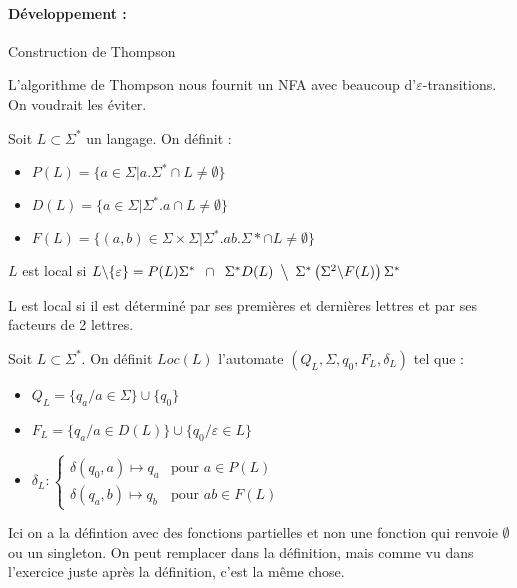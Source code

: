 \paragraph{Développement :} Construction de Thompson

\begin{rem}
	L'algorithme de Thompson nous fournit un NFA avec beaucoup d'$\varepsilon$-transitions. On voudrait les éviter.
\end{rem}

\begin{definition}
	Soit $L \subset \Sigma^*$ un langage. On définit : \begin{itemize}
		\item $P(L) = \{a \in \Sigma | a.\Sigma^* \cap L \neq \emptyset\}$
		\item $D(L) = \{a \in \Sigma | \Sigma^*.a \cap L \neq \emptyset\}$
		\item $F(L) = \{(a,b) \in \Sigma \times \Sigma | \Sigma^*.ab.\Sigma* \cap L \neq \emptyset\}$
	\end{itemize}
	$L$ est local si $L\backslash \{\varepsilon\} = P(L)\Sigma^* \enspace \cap \enspace \Sigma^*D(L) \enspace \big\backslash \enspace \Sigma^*\left(\Sigma^2 \backslash F(L)\right) \Sigma^*$
\end{definition}

\begin{rem}
	L est local si il est déterminé par ses premières et dernières lettres et par ses facteurs de 2 lettres.
\end{rem}

\begin{definition}
	Soit $L \subset \Sigma^*$. On définit $Loc(L)$ l'automate $(Q_L, \Sigma, q_0, F_L, \delta_L)$ tel que : \begin{itemize}
		\item $Q_L = \{q_a / a \in \Sigma\} \cup \{q_0\}$
		\item $F_L = \{q_a / a \in D(L)\} \cup \{q_0 / \varepsilon \in L\}$
		\item $\delta_L : \left\{ \begin{array}{ll} 
			\delta(q_0, a) \mapsto q_a & \text{pour }a \in P(L)\\
		\delta(q_a, b) \mapsto q_b & \text{pour } ab \in F(L)
		\end{array} \right.$
	\end{itemize}
\end{definition}

\begin{com}
	Ici on a la défintion avec des fonctions partielles et non une fonction qui renvoie $\emptyset$ ou un singleton. On peut remplacer dans la définition, mais comme vu dans l'exercice juste après la définition, c'est la même chose.
\end{com}

